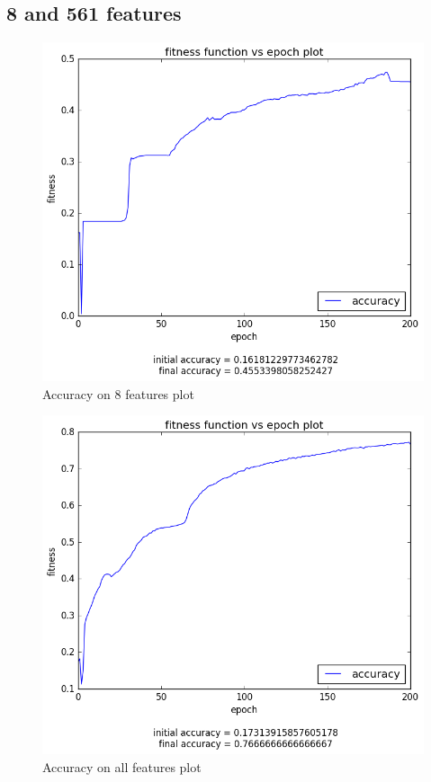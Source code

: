 \documentclass[12pt,a4paper]{article}
\begin{document}
\subsection{8 and 561 features}
\begin{figure}[H]
\centering
\includegraphics[scale=0.4]{img/8_3_acc.png}
\caption{Accuracy on 8 features plot}
\end{figure}
\begin{figure}[H]
\centering
\includegraphics[scale=0.4]{img/all_3_acc.png}
\caption{Accuracy on all features plot}
\end{figure}
\end{document}
